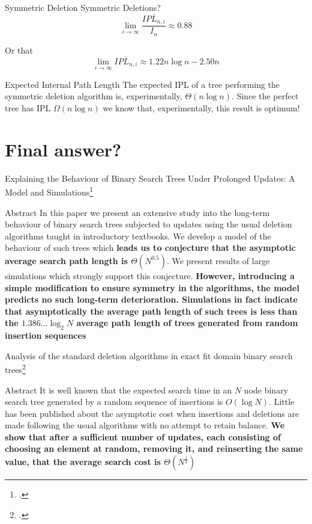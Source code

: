 \documentclass{beamer}
\begin{document}
\begin{frame}{Symmetric Deletion}
    Symmetric Deletions?
    \pause
    $$
    \lim_{i \to \infty} \frac{\overline{IPL_{n,i}}}{I_n} \approx 0.88
    $$

    Or that
    $$
    \lim_{i \to \infty} \overline{IPL_{n,i}}\approx 1.22n \log n - 2.50n
    $$
    \pause
    \begin{block}{Expected Internal Path Length}
        The expected IPL of a tree performing the symmetric deletion algorithm is, experimentally, $\Theta(n \log n)$. Since the perfect tree has IPL $\Omega(n \log n)$ we know that, experimentally, this result is optimum!
    \end{block}
\end{frame}

\section{Final answer?}

\begin{frame}{Explaining the Behaviour of Binary Search Trees Under Prolonged Updates: A Model and Simulations\footcite{culberson1989explaining}}
    \footnotesize
    \begin{block}{Abstract}
        In this paper we present an extensive study into the long-term behaviour of binary search trees subjected to updates using the usual deletion algorithms taught in introductory textbooks. We develop a model of the behaviour of such trees which \textbf{leads us to conjecture that the asymptotic average search path length is $\Theta(N^{0.5})$}. We present results of large simulations which strongly support this conjecture. \textbf{However, introducing a simple modification to ensure symmetry in the algorithms, the model predicts no such long-term deterioration. Simulations in fact indicate that asymptotically the average path length of such trees is less than the $1.386\ldots\log_2 N$ average path length of trees generated from random insertion sequences}
    \end{block}
\end{frame}

\begin{frame}{Analysis of the standard deletion algorithms in exact fit domain binary search trees\footcite{culberson1990analysis}}
    \begin{block}{Abstract}
        It is well known that the expected search time in an $N$ node binary search tree generated by a random sequence of insertions is $O(\log N)$. Little has been published about the asymptotic cost when insertions and deletions are made following the usual algorithms with no attempt to retain balance. \textbf{We show that after a sufficient number of updates, each consisting of choosing an element at random, removing it, and reinserting the same value, that the average search cost is $\Theta(N^{\frac{1}{2}})$}
    \end{block}
\end{frame}
\end{document}
